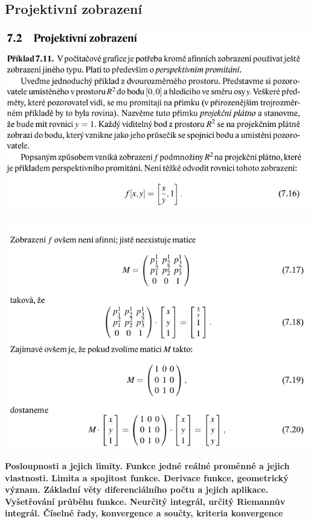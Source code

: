 \documentclass[12pt,a4paper]{article}
\begin{document}
\subsection{Projektivní zobrazení}
\begin{center}
	\includegraphics[scale=0.6]{img/ProjektivniZobrazeni1}
\end{center}
\begin{center}
	\includegraphics[scale=0.6]{img/ProjektivniZobrazeni2}
\end{center}
\newpage
\textbf{Posloupnosti a jejich limity. Funkce jedné reálné proměnné a jejich vlastnosti. Limita a spojitost funkce. Derivace funkce, geometrický význam. Základní věty diferenciálního počtu a jejich aplikace. Vyšetřování průběhu funkce. Neurčitý integrál, určitý Riemannův integrál. Číselné řady, konvergence a součty, kriteria konvergence}
\end{document}

